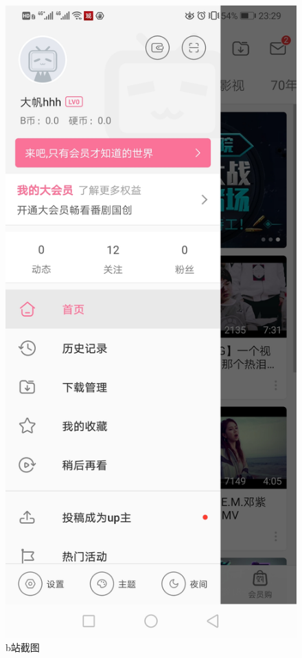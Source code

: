 \documentclass{article}
\begin{document}
\begin{figure}[h!]
	\centering
	\includegraphics[scale=0.2]{b.jpg}
	\caption{b站截图}
	\label{fig:ggwrqc.jpg}
\end{figure}
\end{document}
